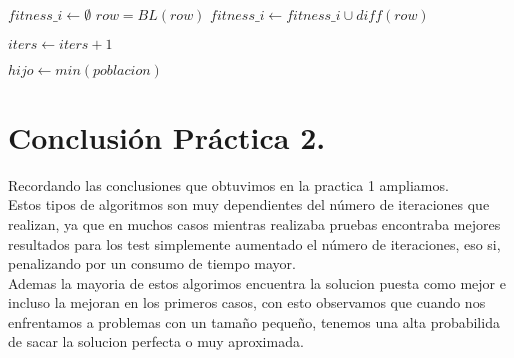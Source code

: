 \begin{algorithm}[H]
\begin{algorithmic}[1]
         
          \State $ fitness\_i \gets \emptyset$
            \State $row = BL(row)$ 
            \State $fitness\_i \gets fitness\_i \cup diff(row)$ 
          \EndFor
        \EndIf

        \State $iters \gets iters + 1 $
      \EndWhile

      \State $hijo \gets min(poblacion)$
      
      \State {}
    \EndFunction
  \end{algorithmic}
\end{algorithm}


\section{Conclusión Práctica 2.}

Recordando las conclusiones que obtuvimos en la practica 1 ampliamos. \\

Estos tipos de algoritmos son muy dependientes del número de iteraciones que realizan, ya que en muchos casos mientras realizaba pruebas
encontraba mejores resultados para los test simplemente aumentado el número de iteraciones, eso si, penalizando por un consumo de tiempo mayor.\\
Ademas la mayoria de estos algorimos encuentra la solucion puesta como mejor e incluso la mejoran en los primeros casos, con esto observamos que cuando nos 
enfrentamos a problemas con un tamaño pequeño, tenemos una alta probabilida de sacar la solucion perfecta o muy aproximada.



